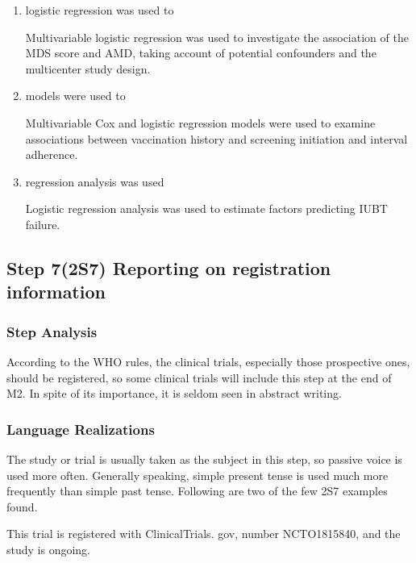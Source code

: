 \documentclass[a4paper]{ctexbook}
\begin{document}
    \begin{enumerate}
      \item logistic regression was used to
      \begin{eg}{}
        Multivariable logistic regression was used to investigate the association of the MDS score and AMD, taking account of potential confounders and the multicenter study design.   
      \end{eg}
      \item models were used to
      \begin{eg}{}
        Multivariable Cox and logistic regression models were used to examine associations between vaccination history and screening initiation and interval adherence. 
      \end{eg}
      \item regression analysis was used
      \begin{eg}{}
        Logistic regression analysis was used to estimate factors predicting IUBT failure.   
      \end{eg}
    \end{enumerate}

  \subsection{Step 7(2S7) Reporting on registration information}

    \subsubsection{Step Analysis}

    According to the WHO rules, the clinical trials, especially those prospective ones, should be registered, so some clinical trials will include this step at the end of M2. In spite of its importance, it is seldom seen in abstract writing.

    \subsubsection{Language Realizations}

    The study or trial is usually taken as the subject in this step, so passive voice is used more often. Generally speaking, simple present tense is used much more frequently than simple past tense. Following are two of the few 2S7 examples found.

    \begin{eg}{}
      This trial is registered with ClinicalTrials. gov, number NCTO1815840, and the study is ongoing.
    \end{eg}
\end{document}
